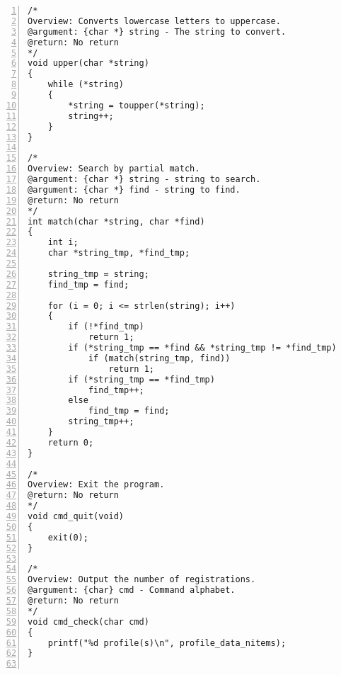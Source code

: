 \documentclass[autodetect-engine,dvi=dvipdfmx,ja=standard,
               a4j,11pt]{bxjsarticle}
\begin{document}
\begin{Verbatim}[numbers=left, xleftmargin=10mm, numbersep=6pt,
    fontsize=\small, baselinestretch=0.8]
/*
Overview: Converts lowercase letters to uppercase.
@argument: {char *} string - The string to convert.
@return: No return
*/
void upper(char *string)
{
    while (*string)
    {
        *string = toupper(*string);
        string++;
    }
}

/*
Overview: Search by partial match.
@argument: {char *} string - string to search.
@argument: {char *} find - string to find.
@return: No return
*/
int match(char *string, char *find)
{
    int i;
    char *string_tmp, *find_tmp;

    string_tmp = string;
    find_tmp = find;

    for (i = 0; i <= strlen(string); i++)
    {
        if (!*find_tmp)
            return 1;
        if (*string_tmp == *find && *string_tmp != *find_tmp)
            if (match(string_tmp, find))
                return 1;
        if (*string_tmp == *find_tmp)
            find_tmp++;
        else
            find_tmp = find;
        string_tmp++;
    }
    return 0;
}

/*
Overview: Exit the program.
@return: No return
*/
void cmd_quit(void)
{
    exit(0);
}

/*
Overview: Output the number of registrations.
@argument: {char} cmd - Command alphabet.
@return: No return
*/
void cmd_check(char cmd)
{
    printf("%d profile(s)\n", profile_data_nitems);
}


\end{Verbatim}
\end{document}
